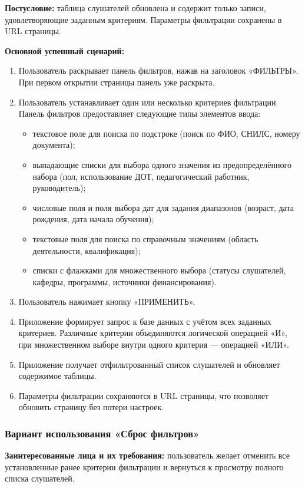 \textbf{Постусловие:} таблица слушателей обновлена и содержит только записи, удовлетворяющие заданным критериям. Параметры фильтрации сохранены в URL страницы.

\textbf{Основной успешный сценарий:}
\begin{enumerate}
	\item Пользователь раскрывает панель фильтров, нажав на заголовок «ФИЛЬТРЫ». При первом открытии страницы панель уже раскрыта.
	\item Пользователь устанавливает один или несколько критериев фильтрации. Панель фильтров предоставляет следующие типы элементов ввода:
	\begin{itemize}
		\item текстовое поле для поиска по подстроке (поиск по ФИО, СНИЛС, номеру документа);
		\item выпадающие списки для выбора одного значения из предопределённого набора (пол, использование ДОТ, педагогический работник, руководитель);
		\item числовые поля и поля выбора дат для задания диапазонов (возраст, дата рождения, дата начала обучения);
		\item текстовые поля для поиска по справочным значениям (область деятельности, квалификация);
		\item списки с флажками для множественного выбора (статусы слушателей, кафедры, программы, источники финансирования).
	\end{itemize}
	\item Пользователь нажимает кнопку «ПРИМЕНИТЬ».
	\item Приложение формирует запрос к базе данных с учётом всех заданных критериев. Различные критерии объединяются логической операцией «И», при множественном выборе внутри одного критерия — операцией «ИЛИ».
	\item Приложение получает отфильтрованный список слушателей и обновляет содержимое таблицы.
	\item Параметры фильтрации сохраняются в URL страницы, что позволяет обновить страницу без потери настроек.
\end{enumerate}

\subsubsection{Вариант использования «Сброс фильтров»}

\textbf{Заинтересованные лица и их требования:} пользователь желает отменить все установленные ранее критерии фильтрации и вернуться к просмотру полного списка слушателей.

